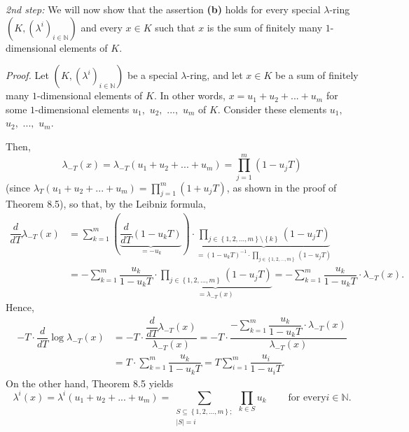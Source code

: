 \documentclass[numbers=enddot,12pt,final,onecolumn,notitlepage]{scrartcl}%
\begin{document}
\textit{2nd step:} We will now show that the assertion \textbf{(b)} holds for
every special $\lambda$-ring $\left(  K,\left(  \lambda^{i}\right)
_{i\in\mathbb{N}}\right)  $ and every $x\in K$ such that $x$ is the sum of
finitely many $1$-dimensional elements of $K$.

\textit{Proof.} Let $\left(  K,\left(  \lambda^{i}\right)  _{i\in\mathbb{N}%
}\right)  $ be a special $\lambda$-ring, and let $x\in K$ be a sum of finitely
many $1$-dimensional elements of $K$. In other words, $x=u_{1}+u_{2}%
+...+u_{m}$ for some $1$-dimensional elements $u_{1},$ $u_{2},$ $...,$ $u_{m}$
of $K$. Consider these elements $u_{1},$ $u_{2},$ $...,$ $u_{m}$.

Then,%
\[
\lambda_{-T}\left(  x\right)  =\lambda_{-T}\left(  u_{1}+u_{2}+...+u_{m}%
\right)  =\prod_{j=1}^{m}\left(  1-u_{j}T\right)
\]
(since $\lambda_{T}\left(  u_{1}+u_{2}+...+u_{m}\right)  =\prod\limits_{j=1}%
^{m}\left(  1+u_{j}T\right)  $, as shown in the proof of Theorem 8.5), so
that, by the Leibniz formula,%
\begin{align*}
\dfrac{d}{dT}\lambda_{-T}\left(  x\right)   &  =\sum_{k=1}^{m}\left(
\underbrace{\dfrac{d}{dT}\left(  1-u_{k}T\right)  }_{=-u_{k}}\right)
\cdot\underbrace{\prod_{j\in\left\{  1,2,...,m\right\}  \setminus\left\{
k\right\}  }\left(  1-u_{j}T\right)  }_{=\left(  1-u_{k}T\right)  ^{-1}%
\cdot\prod\limits_{j\in\left\{  1,2,...,m\right\}  }\left(  1-u_{j}T\right)
}\\
&  =-\sum_{k=1}^{m}\dfrac{u_{k}}{1-u_{k}T}\cdot\underbrace{\prod
\limits_{j\in\left\{  1,2,...,m\right\}  }\left(  1-u_{j}T\right)  }%
_{=\lambda_{-T}\left(  x\right)  }=-\sum_{k=1}^{m}\dfrac{u_{k}}{1-u_{k}T}%
\cdot\lambda_{-T}\left(  x\right)  .
\end{align*}
Hence,%
\begin{align}
-T\cdot\dfrac{d}{dT}\log\lambda_{-T}\left(  x\right)   &  =-T\cdot
\dfrac{\dfrac{d}{dT}\lambda_{-T}\left(  x\right)  }{\lambda_{-T}\left(
x\right)  }=-T\cdot\dfrac{-\sum\limits_{k=1}^{m}\dfrac{u_{k}}{1-u_{k}T}%
\cdot\lambda_{-T}\left(  x\right)  }{\lambda_{-T}\left(  x\right)
}\nonumber\\
&  =T\cdot\sum\limits_{k=1}^{m}\dfrac{u_{k}}{1-u_{k}T}=T\sum\limits_{i=1}%
^{m}\dfrac{u_{i}}{1-u_{i}T}. \label{9.2.2step}%
\end{align}
On the other hand, Theorem 8.5 yields%
\[
\lambda^{i}\left(  x\right)  =\lambda^{i}\left(  u_{1}+u_{2}+...+u_{m}\right)
=\sum\limits_{\substack{S\subseteq\left\{  1,2,...,m\right\}  ;\\\left\vert
S\right\vert =i}}\prod\limits_{k\in S}u_{k}\ \ \ \ \ \ \ \ \ \ \text{for every
}i\in\mathbb{N}.
\]
\end{document}
